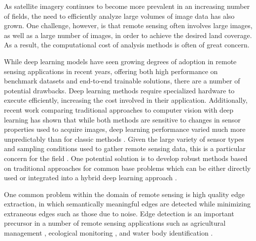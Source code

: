 \documentclass[conference]{IEEEtran}
\makeatletter
\DeclareRobustCommand\onedot{\futurelet\@let@token\@onedot}
\def\@onedot{\ifx\@let@token.\else.\null\fi\xspace}
\def\etal{\emph{et al}\onedot}
\makeatother
\begin{document}

As satellite imagery continues to become more prevalent in an increasing number of fields, the need to efficiently analyze large volumes of image data has also grown. One challenge, however, is that remote sensing often involves large images, as well as a large number of images, in order to achieve the desired land coverage. As a result, the computational cost of analysis methods is often of great concern.

While deep learning models have seen growing degrees of adoption in remote sensing applications in recent years, offering both high performance on benchmark datasets and end-to-end trainable solutions, there are a number of potential drawbacks. Deep learning methods require specialized hardware to execute efficiently, increasing the cost involved in their application. Additionally, recent work comparing traditional approaches to computer vision with deep learning has shown that while both methods are sensitive to changes in sensor properties used to acquire images, deep learning performance varied much more unpredictably than for classic methods \cite{TsotsosEtAl2019}. Given the large variety of sensor types and sampling conditions used to gather remote sensing data, this is a particular concern for the field \cite{LiEtAl2019}. One potential solution is to develop robust methods based on traditional approaches for common base problems which can be either directly used or integrated into a hybrid deep learning approach \cite{OMahonyEtAl2020}. 

One common problem within the domain of remote sensing is high quality edge extraction, in which semantically meaningful edges are detected while minimizing extraneous edges such as those due to noise. Edge detection is an important precursor in a number of remote sensing applications such as agricultural management \cite{DaiEtAl2020}, ecological monitoring \cite{LiuEtAl2011}, and water body identification \cite{VigneshThyagharajan2017}. 
\end{document}
